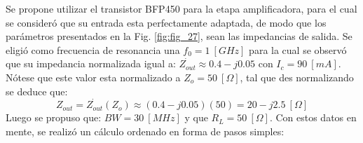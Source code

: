 \documentclass[conference]{IEEEtran}
\begin{document}
Se propone utilizar el transistor BFP450 para la etapa amplificadora, para el cual se consideró que su entrada esta perfectamente adaptada, de modo que los parámetros presentados en la Fig. \ref{fig:fig_27}, sean las impedancias de salida. Se eligió como frecuencia de resonancia una $f_{0} = 1 \ [GHz]$ para la cual se observó que su impedancia normalizada igual a: $\dot{Z_{out}} \approx 0.4 - j0.05$ con $I_{c} = 90 \ [mA]$. Nótese que este valor esta normalizado a $Z_{o} = 50 \ [\Omega]$, tal que des normalizando se deduce que:
\begin{equation}
    Z_{out} = \dot{Z_{out}}(Z_{o}) \approx (0.4 - j0.05)(50) = 20 - j2.5 \ [\Omega]
    \label{eq_77}
\end{equation}
Luego se propuso que: $BW = 30 \ [MHz]$ y que $R_{L} = 50 \ [\Omega]$. Con estos datos en mente, se realizó un cálculo ordenado en forma de pasos simples:
\end{document}
